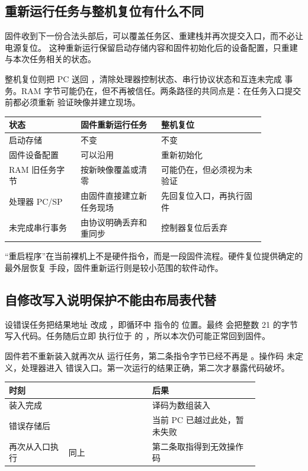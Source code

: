 \subsection{重新运行任务与整机复位有什么不同}

固件收到下一份合法头部后，可以覆盖任务区、重建栈并再次提交入口，而不必让电源复位。
这种重新运行保留启动存储内容和固件初始化后的设备配置，只重建与本次任务相关的状态。

整机复位则把 PC 送回 ，清除处理器控制状态、串行协议状态和互连未完成
事务。RAM 字节可能仍在，但不再被信任。两条路径的共同点是：在任务入口提交前都必须重新
验证映像并建立现场。

\begin{longtable}{|L{0.24\linewidth}|L{0.27\linewidth}|L{0.35\linewidth}|}
\hline
{}
状态 & 固件重新运行任务 & 整机复位 \\ \hline
启动存储 & 不变 & 不变 \\ \hline
固件设备配置 & 可以沿用 & 重新初始化 \\ \hline
RAM 旧任务字节 & 按新映像覆盖或清零 & 可能仍在，但必须视为未验证 \\ \hline
处理器 PC/SP & 由固件直接建立新任务现场 & 先回复位入口，再执行固件 \\ \hline
未完成串行事务 & 由协议明确丢弃和重同步 & 控制器复位后丢弃 \\ \hline
\end{longtable}

“重启程序”在当前裸机上不是硬件指令，而是一段固件流程。硬件复位提供确定的最外层恢复
手段，固件重新运行则是较小范围的软件动作。

\subsection{自修改写入说明保护不能由布局表代替}

设错误任务把结果地址  改成 ，即循环中  指令的
位置。最终  会把整数 21 的字节  写入代码。任务随后立即
执行位于  的 ，所以本次仍可能正常回到固件。

固件若不重新装入就再次从  运行任务，第二条指令字节已经不再是
。操作码  未定义，处理器进入
 错误入口。第一次运行的结果正确，第二次才暴露代码破坏。

\begin{longtable}{|L{0.20\linewidth}|L{0.28\linewidth}|L{0.36\linewidth}|}
\hline
{}
时刻 &  & 后果 \\ \hline
装入完成 &  & 译码为数组装入 \\ \hline
错误存储后 &  & 当前 PC 已越过此处，暂未失败 \\ \hline
再次从入口执行 & 同上 & 第二条取指得到无效操作码 \\ \hline
\end{longtable}

